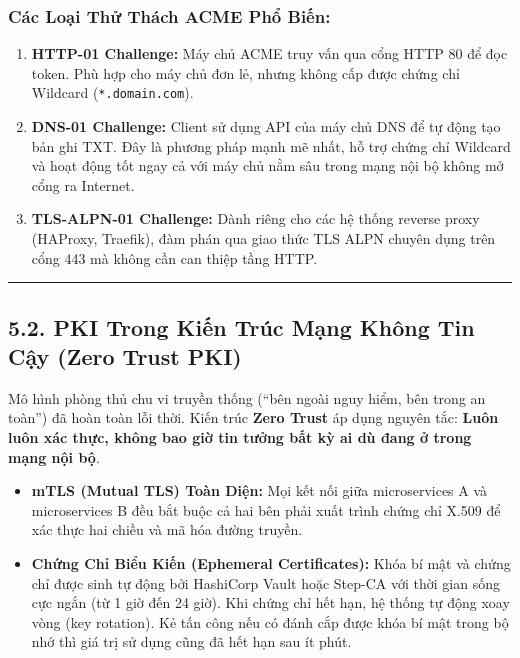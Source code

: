 \documentclass[
]{article}
\providecommand{\tightlist}{%
  \setlength{\itemsep}{0pt}\setlength{\parskip}{0pt}}
\begin{document}
\subsubsection{Các Loại Thử Thách ACME Phổ
Biến:}\label{cuxe1c-loux1ea1i-thux1eed-thuxe1ch-acme-phux1ed5-biux1ebfn}

\begin{enumerate}
\def\labelenumi{\arabic{enumi}.}
\tightlist
\item
  \textbf{HTTP-01 Challenge:} Máy chủ ACME truy vấn qua cổng HTTP 80 để
  đọc token. Phù hợp cho máy chủ đơn lẻ, nhưng không cấp được chứng chỉ
  Wildcard (\texttt{*.domain.com}).
\item
  \textbf{DNS-01 Challenge:} Client sử dụng API của máy chủ DNS để tự
  động tạo bản ghi TXT. Đây là phương pháp mạnh mẽ nhất, hỗ trợ chứng
  chỉ Wildcard và hoạt động tốt ngay cả với máy chủ nằm sâu trong mạng
  nội bộ không mở cổng ra Internet.
\item
  \textbf{TLS-ALPN-01 Challenge:} Dành riêng cho các hệ thống reverse
  proxy (HAProxy, Traefik), đàm phán qua giao thức TLS ALPN chuyên dụng
  trên cổng 443 mà không cần can thiệp tầng HTTP.
\end{enumerate}

\begin{center}\rule{0.5\linewidth}{0.5pt}\end{center}

\subsection{5.2. PKI Trong Kiến Trúc Mạng Không Tin Cậy (Zero Trust
PKI)}\label{pki-trong-kiux1ebfn-truxfac-mux1ea1ng-khuxf4ng-tin-cux1eady-zero-trust-pki}

Mô hình phòng thủ chu vi truyền thống (``bên ngoài nguy hiểm, bên trong
an toàn'') đã hoàn toàn lỗi thời. Kiến trúc \textbf{Zero Trust} áp dụng
nguyên tắc: \textbf{Luôn luôn xác thực, không bao giờ tin tưởng bất kỳ
ai dù đang ở trong mạng nội bộ}.

\begin{itemize}
\tightlist
\item
  \textbf{mTLS (Mutual TLS) Toàn Diện:} Mọi kết nối giữa microservices A
  và microservices B đều bắt buộc cả hai bên phải xuất trình chứng chỉ
  X.509 để xác thực hai chiều và mã hóa đường truyền.
\item
  \textbf{Chứng Chỉ Biểu Kiến (Ephemeral Certificates):} Khóa bí mật và
  chứng chỉ được sinh tự động bởi HashiCorp Vault hoặc Step-CA với thời
  gian sống cực ngắn (từ 1 giờ đến 24 giờ). Khi chứng chỉ hết hạn, hệ
  thống tự động xoay vòng (key rotation). Kẻ tấn công nếu có đánh cắp
  được khóa bí mật trong bộ nhớ thì giá trị sử dụng cũng đã hết hạn sau
  ít phút.
\end{itemize}
\end{document}
